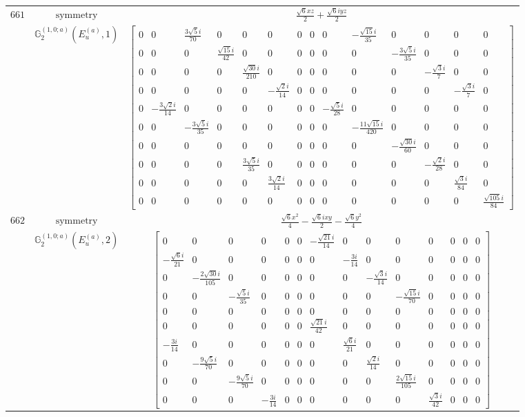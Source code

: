 \documentclass[fleqn,8pt,landscape]{jsarticle}
\begin{document}
\begin{longtable}{ccc}
$ 661 $ & $ \text{symmetry} $ & $ \frac{\sqrt{6} x z}{2} + \frac{\sqrt{6} i y z}{2} $ \\
$  $ & $ \mathbb{G}_{2}^{(1,0;a)}(E_{u}^{(a)},1) $ & $ \begin{bmatrix} 0 & 0 & \frac{3 \sqrt{5} i}{70} & 0 & 0 & 0 & 0 & 0 & 0 & - \frac{\sqrt{15} i}{35} & 0 & 0 & 0 & 0 \\ 0 & 0 & 0 & \frac{\sqrt{15} i}{42} & 0 & 0 & 0 & 0 & 0 & 0 & - \frac{3 \sqrt{5} i}{35} & 0 & 0 & 0 \\ 0 & 0 & 0 & 0 & \frac{\sqrt{30} i}{210} & 0 & 0 & 0 & 0 & 0 & 0 & - \frac{\sqrt{3} i}{7} & 0 & 0 \\ 0 & 0 & 0 & 0 & 0 & - \frac{\sqrt{2} i}{14} & 0 & 0 & 0 & 0 & 0 & 0 & - \frac{\sqrt{3} i}{7} & 0 \\ 0 & - \frac{3 \sqrt{2} i}{14} & 0 & 0 & 0 & 0 & 0 & 0 & - \frac{\sqrt{5} i}{28} & 0 & 0 & 0 & 0 & 0 \\ 0 & 0 & - \frac{3 \sqrt{5} i}{35} & 0 & 0 & 0 & 0 & 0 & 0 & - \frac{11 \sqrt{15} i}{420} & 0 & 0 & 0 & 0 \\ 0 & 0 & 0 & 0 & 0 & 0 & 0 & 0 & 0 & 0 & - \frac{\sqrt{30} i}{60} & 0 & 0 & 0 \\ 0 & 0 & 0 & 0 & \frac{3 \sqrt{5} i}{35} & 0 & 0 & 0 & 0 & 0 & 0 & - \frac{\sqrt{2} i}{28} & 0 & 0 \\ 0 & 0 & 0 & 0 & 0 & \frac{3 \sqrt{2} i}{14} & 0 & 0 & 0 & 0 & 0 & 0 & \frac{\sqrt{3} i}{84} & 0 \\ 0 & 0 & 0 & 0 & 0 & 0 & 0 & 0 & 0 & 0 & 0 & 0 & 0 & \frac{\sqrt{105} i}{84} \end{bmatrix} $ \\ \hline
$ 662 $ & $ \text{symmetry} $ & $ \frac{\sqrt{6} x^{2}}{4} - \frac{\sqrt{6} i x y}{2} - \frac{\sqrt{6} y^{2}}{4} $ \\
$  $ & $ \mathbb{G}_{2}^{(1,0;a)}(E_{u}^{(a)},2) $ & $ \begin{bmatrix} 0 & 0 & 0 & 0 & 0 & 0 & - \frac{\sqrt{21} i}{14} & 0 & 0 & 0 & 0 & 0 & 0 & 0 \\ - \frac{\sqrt{6} i}{21} & 0 & 0 & 0 & 0 & 0 & 0 & - \frac{3 i}{14} & 0 & 0 & 0 & 0 & 0 & 0 \\ 0 & - \frac{2 \sqrt{30} i}{105} & 0 & 0 & 0 & 0 & 0 & 0 & - \frac{\sqrt{3} i}{14} & 0 & 0 & 0 & 0 & 0 \\ 0 & 0 & - \frac{\sqrt{5} i}{35} & 0 & 0 & 0 & 0 & 0 & 0 & - \frac{\sqrt{15} i}{70} & 0 & 0 & 0 & 0 \\ 0 & 0 & 0 & 0 & 0 & 0 & 0 & 0 & 0 & 0 & 0 & 0 & 0 & 0 \\ 0 & 0 & 0 & 0 & 0 & 0 & \frac{\sqrt{21} i}{42} & 0 & 0 & 0 & 0 & 0 & 0 & 0 \\ - \frac{3 i}{14} & 0 & 0 & 0 & 0 & 0 & 0 & \frac{\sqrt{6} i}{21} & 0 & 0 & 0 & 0 & 0 & 0 \\ 0 & - \frac{9 \sqrt{5} i}{70} & 0 & 0 & 0 & 0 & 0 & 0 & \frac{\sqrt{2} i}{14} & 0 & 0 & 0 & 0 & 0 \\ 0 & 0 & - \frac{9 \sqrt{5} i}{70} & 0 & 0 & 0 & 0 & 0 & 0 & \frac{2 \sqrt{15} i}{105} & 0 & 0 & 0 & 0 \\ 0 & 0 & 0 & - \frac{3 i}{14} & 0 & 0 & 0 & 0 & 0 & 0 & \frac{\sqrt{3} i}{42} & 0 & 0 & 0 \end{bmatrix} $ \\ \hline

\end{longtable}
\end{document}
